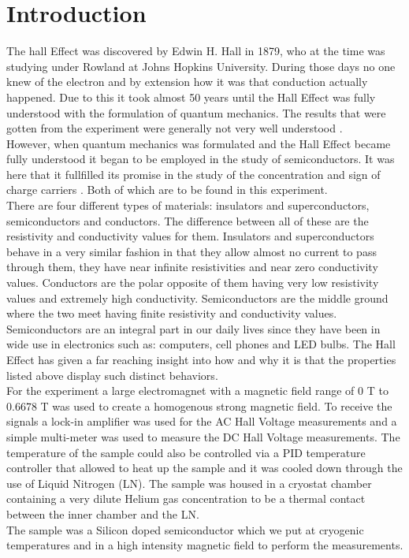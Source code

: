 \documentclass[twocolumn]{article}
\begin{document}
\section{Introduction}
The hall Effect was discovered by Edwin H. Hall in 1879, who at the time was 
studying under Rowland at Johns Hopkins University. During those days no one knew of 
the electron and by extension how it was that conduction actually happened. 
Due to this it took almost 50 years until the Hall Effect was fully understood 
with the formulation of quantum mechanics. The results that were gotten from 
the experiment were generally not very well understood \cite{ref:1}.
\\
However, when quantum mechanics was formulated and the Hall Effect became fully 
understood it began to be employed in the study of semiconductors. It was here 
that it fullfilled its promise in the study of the concentration and sign of 
charge carriers \cite{ref:1}. Both of which are to be found in this experiment. 
\\
There are four different types of materials: insulators and superconductors, 
semiconductors and conductors. The difference between all of these are the 
resistivity and conductivity values for them. Insulators and superconductors 
behave in a very similar fashion in that they allow almost no current to pass 
through them, they have near infinite resistivities and near zero conductivity 
values. Conductors are the polar opposite of them having very low resistivity 
values and extremely high conductivity. Semiconductors are the middle ground 
where the two meet having finite resistivity and conductivity values.
\\
Semiconductors are an integral 
part in our daily lives since they have been in wide use in electronics such 
as: computers, cell phones and LED bulbs. The Hall Effect has given a far 
reaching insight into how and why it is that the properties listed above 
display such distinct behaviors.
\\
For the experiment a large electromagnet with a magnetic field range of 0 T to 
0.6678 T was used to create a homogenous strong magnetic field. To receive the 
signals a lock-in amplifier was used for the AC Hall Voltage measurements and a 
simple multi-meter was used to measure the DC Hall Voltage measurements. The 
temperature of the sample could also be controlled via a PID temperature 
controller that allowed to heat up the sample and it was cooled down through 
the use of Liquid Nitrogen (LN). The sample was housed in a cryostat chamber 
containing a very dilute Helium gas concentration to be a thermal contact 
between the inner chamber and the LN.
\\
The sample was a Silicon doped semiconductor which we put at cryogenic 
temperatures and in a high intensity magnetic field to perform the measurements.
\end{document}
